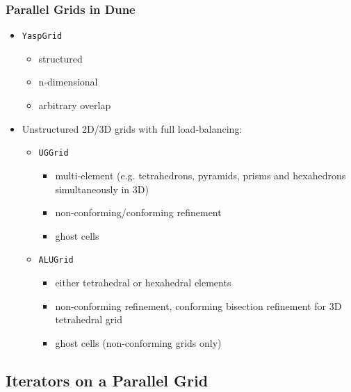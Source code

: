 \documentclass[aspectratio=169,11pt]{beamer}
\theoremstyle{definition}
\begin{document}
\begin{frame}
  \frametitle<presentation>{Parallel Grids in Dune}
  \begin{itemize}
  \item<1-> \lstinline!YaspGrid!
      \begin{itemize}
      \item structured
      \item n-dimensional
      \item arbitrary overlap
      \end{itemize}
  \item<2-> Unstructured 2D/3D grids with full load-balancing:
  \begin{itemize}
  \item<2-> \lstinline!UGGrid!
      \begin{itemize}
      \item multi-element (e.g. tetrahedrons, pyramids, prisms and hexahedrons simultaneously in 3D)
      \item non-conforming/conforming refinement
      \item ghost cells
      \end{itemize}
  \item<3-> \lstinline!ALUGrid!
      \begin{itemize}
      \item either tetrahedral or hexahedral elements
      \item non-conforming refinement, conforming bisection refinement for 3D tetrahedral grid
      \item ghost cells (non-conforming grids only)
      \end{itemize}
      \end{itemize}
  \end{itemize}
\end{frame}

\subsection{Iterators on a Parallel Grid}
\end{document}
